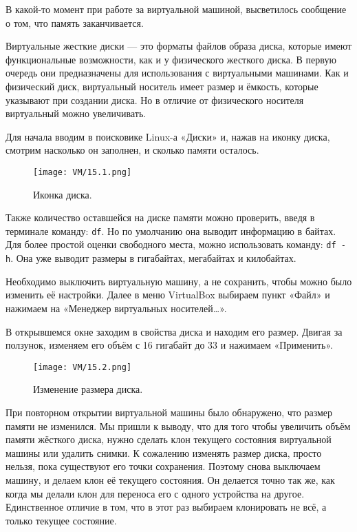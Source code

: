 В какой-то момент при работе за виртуальной машиной, высветилось сообщение о том, что память заканчивается. 

Виртуальные жесткие диски — это форматы файлов образа диска, которые имеют функциональные возможности, как и у физического жесткого диска. В первую очередь они предназначены для использования с виртуальными машинами. Как и физический диск, виртуальный носитель имеет размер и ёмкость, которые указывают при создании диска. Но в отличие от физического носителя виртуальный можно увеличивать.

Для начала вводим в поисковике Linux-а «Диски» и, нажав на иконку диска, смотрим насколько он заполнен, и сколько памяти осталось. 

\begin{figure}[h]
		\centering
		\texttt{[image: VM/15.1.png]}
\caption{Иконка диска.}
\label{ris:image}
\end{figure}

Также количество оставшейся на диске памяти можно проверить, введя в терминале команду: \texttt{df}. Но по умолчанию она выводит информацию в байтах. Для более простой оценки свободного места, можно использовать команду: \texttt{df -h}. Она уже выводит размеры в гигабайтах, мегабайтах и килобайтах.

Необходимо выключить виртуальную машину, а не сохранить, чтобы можно было изменить её настройки. Далее в меню VirtualBox выбираем пункт «Файл» и нажимаем на «Менеджер виртуальных носителей…».

В открывшемся окне заходим в свойства диска и находим его размер. Двигая за ползунок, изменяем его объём с 16 гигабайт до 33 и нажимаем «Применить». 

\begin{figure}[h]
		\centering
		\texttt{[image: VM/15.2.png]}
\caption{Изменение размера диска.}
\label{ris:image}
\end{figure}

При повторном открытии виртуальной машины было обнаружено, что размер памяти не изменился. Мы пришли к выводу, что для того чтобы увеличить объём памяти жёсткого диска, нужно сделать клон текущего состояния виртуальной машины или удалить снимки. К сожалению изменять размер диска, просто нельзя, пока существуют его точки сохранения. Поэтому снова выключаем машину, и делаем клон её текущего состояния. Он делается точно так же, как когда мы делали клон для переноса его с одного устройства на другое. Единственное отличие в том, что в этот раз выбираем клонировать не всё, а только текущее состояние. 

